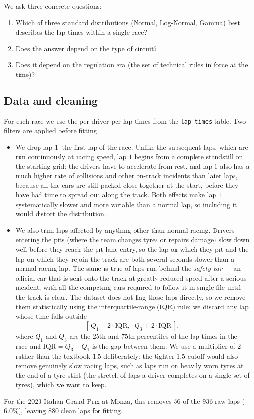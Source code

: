 \documentclass[11pt,a4paper]{article}
\newcommand{\code}[1]{\texttt{\small #1}}
\theoremstyle{remark}
\begin{document}
We ask three concrete questions:
\begin{enumerate}
  \item Which of three standard distributions (Normal, Log-Normal,
  Gamma) best describes the lap times within a single race?
  \item Does the answer depend on the type of circuit?
  \item Does it depend on the regulation era (the set of technical
  rules in force at the time)?
\end{enumerate}

\subsection{Data and cleaning}
For each race we use the per-driver per-lap times from the
\code{lap\_times} table. Two filters are applied before fitting.
\begin{itemize}
  \item We drop lap $1$, the first lap of the race. Unlike the
  subsequent laps, which are run continuously at racing speed,
  lap $1$ begins from a complete standstill on the starting grid:
  the drivers have to accelerate from rest, and lap $1$ also has
  a much higher rate of collisions and other on-track incidents
  than later laps, because all the cars are still packed close
  together at the start, before they have had time to spread out
  along the track.
  Both effects make lap $1$ systematically slower and more
  variable than a normal lap, so including it would distort the
  distribution.
  \item We also trim laps affected by anything other than normal
  racing. Drivers entering the pits (where the team changes tyres
  or repairs damage) slow down well before they reach the pit-lane
  entry, so the lap on which they pit and the lap on which they
  rejoin the track are both several seconds slower than a normal
  racing lap. The same is true of laps run behind the \emph{safety
  car} --- an official car that is sent onto the track at greatly
  reduced speed after a serious incident, with all the competing
  cars required to follow it in single file until the track is
  clear. The dataset does not flag these laps directly, so we
  remove them statistically using the interquartile-range (IQR)
  rule: we discard any lap whose time falls outside
  \[
    [\,Q_1 - 2\cdot\mathrm{IQR},\;\; Q_3 + 2\cdot\mathrm{IQR}\,],
  \]
  where $Q_1$ and $Q_3$ are the $25$th and $75$th percentiles of
  the lap times in the race and $\mathrm{IQR} = Q_3 - Q_1$ is the
  gap between them. We use a multiplier of $2$ rather than the
  textbook $1.5$ deliberately: the tighter $1.5$ cutoff would also
  remove genuinely slow racing laps, such as laps run on heavily
  worn tyres at the end of a tyre stint (the stretch of laps a
  driver completes on a single set of tyres), which we want to
  keep.
\end{itemize}
For the $2023$ Italian Grand Prix at Monza, this removes $56$ of
the $936$ raw laps ($6.0\%$), leaving $880$ clean laps for fitting.
\end{document}
